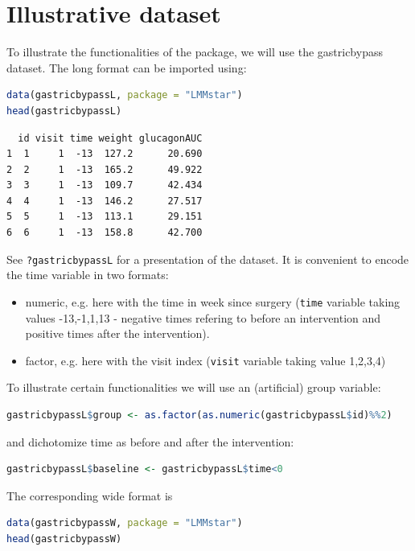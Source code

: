 \documentclass[12pt]{article}
\begin{document}
\clearpage
\section{Illustrative dataset}
\label{sec:org2245a61}

To illustrate the functionalities of the package, we will use the
gastricbypass dataset. The long format can be imported using:
\begin{lstlisting}[language=r,numbers=none]
data(gastricbypassL, package = "LMMstar")
head(gastricbypassL)
\end{lstlisting}

\label{}
\begin{verbatim}
  id visit time weight glucagonAUC
1  1     1  -13  127.2      20.690
2  2     1  -13  165.2      49.922
3  3     1  -13  109.7      42.434
4  4     1  -13  146.2      27.517
5  5     1  -13  113.1      29.151
6  6     1  -13  158.8      42.700
\end{verbatim}


See \texttt{?gastricbypassL} for a presentation of the dataset. It is
convenient to encode the time variable in two formats:
\begin{itemize}
\item numeric, e.g. here with the time in week since surgery (\texttt{time}
variable taking values -13,-1,1,13 - negative times refering to
before an intervention and positive times after the intervention).
\item factor, e.g. here with the visit index (\texttt{visit} variable taking
value 1,2,3,4)
\end{itemize}

To illustrate certain functionalities we will use an (artificial)
group variable:
\begin{lstlisting}[language=r,numbers=none]
gastricbypassL$group <- as.factor(as.numeric(gastricbypassL$id)%%2)
\end{lstlisting}

and dichotomize time as before and after the intervention:
\begin{lstlisting}[language=r,numbers=none]
gastricbypassL$baseline <- gastricbypassL$time<0
\end{lstlisting}

The corresponding wide format is
\begin{lstlisting}[language=r,numbers=none]
data(gastricbypassW, package = "LMMstar")
head(gastricbypassW)
\end{lstlisting}
\end{document}
